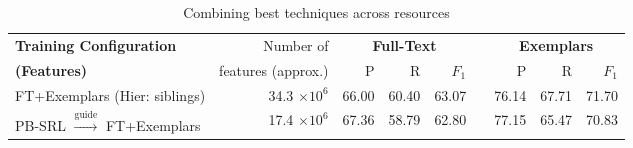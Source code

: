 \begin{table*}\centering\small
\begin{tabular}{lrrrr@{~~}r@{~~}rrr}
\toprule
\textbf{Training Configuration} & Number of & \multicolumn{3}{c}{\textbf{Full-Text}} && \multicolumn{3}{c}{\textbf{Exemplars}} \\
\cline{2-4}\cline{6-8}
\textbf{(Features)} & features (approx.) & P\hphantom{11} & R\hphantom{11} & $F_1$\hphantom{0} && P\hphantom{11} & R\hphantom{11} & $F_1$\hphantom{0} \\
\midrule
FT+Exemplars (Hier: siblings) & 34.3 $\times 10^6$ & 66.00 & 60.40 & 63.07 && 76.14 & 67.71 & 71.70 \\
PB-SRL $\xrightarrow{\text{guide}}$ FT+Exemplars & 17.4 $\times 10^6$ & 67.36 & 58.79 & 62.80 && 77.15 & 65.47 & 70.83 \\
\bottomrule
\end{tabular}
\caption{Combining best techniques across resources }
\label{tbl:bestTech}
\end{table*}
